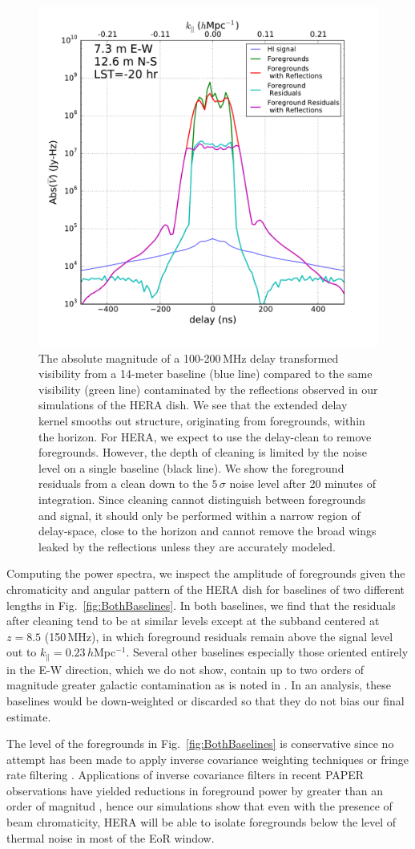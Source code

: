 \documentclass[twocolumn]{emulateapj}
\begin{document}
\begin{figure}
\includegraphics[width=.5\textwidth]{figures/cleaning_noise_Nithya.pdf}
\caption{The absolute magnitude of a  100-200\,MHz delay transformed visibility from a 14-meter baseline (blue line) compared to the same visibility (green line) contaminated by the reflections observed in our simulations of the HERA dish. We see that the extended delay kernel smooths out structure, originating from foregrounds, within the horizon. For HERA, we expect to use the delay-clean to remove foregrounds. However, the depth of cleaning is limited by the noise level on a single baseline (black line). We show the foreground residuals from a clean down to the $5\,\sigma$ noise level after 20 minutes of integration. Since cleaning cannot distinguish between foregrounds and signal, it should only be performed within a narrow region of delay-space, close to the horizon and cannot remove the broad wings leaked by the reflections unless they are accurately modeled.}
\label{fig:Cleaning}
\end{figure}


Computing the power spectra, we inspect the amplitude of foregrounds given the chromaticity and angular pattern of the HERA dish for baselines of two different lengths in Fig.~\ref{fig:BothBaselines}. In both baselines, we find that the residuals after cleaning tend to be at similar levels except at the subband centered at $z=8.5$ (150\,MHz), in which foreground residuals remain above the signal level out to $k_\parallel=0.23$\,$h$Mpc$^{-1}$. Several other baselines especially those oriented entirely in the E-W direction, which we do not show, contain up to two orders of magnitude greater galactic  contamination as is noted in \citet{Thyagarajan:2015b}. In an analysis, these baselines would be down-weighted or discarded so that they do not bias our final estimate. 

The level of the foregrounds in Fig.~\ref{fig:BothBaselines} is conservative since no attempt has been made to apply inverse covariance weighting techniques \citep{Tegmark:1997a,Liu:2011,Dillon:2013,Parsons:2014,Liu:2014a,Liu:2014b,Dillon:2015a,Dillon:2015b,Trott:2016} or fringe rate filtering \citep{Parsons:2015}. Applications of inverse covariance filters in recent PAPER observations have yielded reductions in foreground power by greater than an order of magnitud \citep{Ali:2015}, hence our simulations show that even with the presence of beam chromaticity, HERA will be able to isolate foregrounds below the level of thermal noise in most of the EoR window. 
\end{document}

